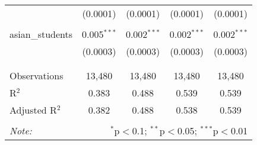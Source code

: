 \begin{table}[!htbp]
\begin{tabular}{@{\extracolsep{-2pt}}lcccc}
  & (0.0001) & (0.0001) & (0.0001) & (0.0001) \\ 
  & & & & \\ 
 asian\_students & 0.005$^{***}$ & 0.002$^{***}$ & 0.002$^{***}$ & 0.002$^{***}$ \\ 
  & (0.0003) & (0.0003) & (0.0003) & (0.0003) \\ 
  & & & & \\ 
\hline \\[-1.8ex] 
Observations & 13,480 & 13,480 & 13,480 & 13,480 \\ 
R$^{2}$ & 0.383 & 0.488 & 0.539 & 0.539 \\ 
Adjusted R$^{2}$ & 0.382 & 0.488 & 0.538 & 0.539 \\ 
\hline 
\hline \\[-1.8ex] 
\textit{Note:}  & \multicolumn{4}{r}{$^{*}$p$<$0.1; $^{**}$p$<$0.05; $^{***}$p$<$0.01} \\ 
\end{tabular} 
\end{table} 
